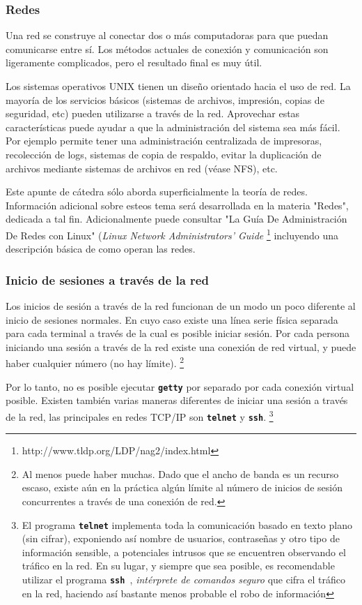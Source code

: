 \documentclass[12pt]{article}
\begin{document}
\subsubsection{ Redes}

 Una red se construye al conectar dos o más computadoras para que puedan
comunicarse entre sí. Los métodos actuales de conexión y comunicación son
ligeramente complicados, pero el resultado final es muy útil.  

 Los sistemas operativos UNIX tienen un diseño orientado hacia el uso 
de red. La mayoría de los servicios básicos (sistemas de archivos, impresión, 
copias de seguridad, etc) pueden utilizarse a través de la red. Aprovechar estas
características puede ayudar a que la administración del sistema sea más fácil. 
Por ejemplo permite tener una administración centralizada de impresoras, recolección 
de logs, sistemas de copia de respaldo, evitar la duplicación 
de archivos mediante sistemas de archivos en red (véase NFS), etc.

 Este apunte de cátedra sólo aborda superficialmente la teoría de
redes. Información adicional sobre esteos tema será desarrollada en la materia 
"Redes", dedicada a tal fin. Adicionalmente puede consultar "La Guía De Administración 
De Redes con Linux" (\textit{Linux Network Administrators' Guide} 
\footnote{	http://www.tldp.org/LDP/nag2/index.html}
incluyendo una descripción básica de como
operan las redes.  

\subsubsection{ Inicio de sesiones a través de la red}

 Los inicios de sesión a través de la red funcionan de un modo un poco
diferente al inicio de sesiones normales. En cuyo caso existe una línea serie 
física separada para cada terminal a través de la cual es posible iniciar sesión. 
Por cada persona iniciando una sesión a través de la red existe una conexión de red
virtual, y puede haber cualquier número (no hay límite).  
\footnote{Al menos puede haber muchas. Dado que el ancho de banda es un
recurso escaso, existe aún en la práctica algún límite al
número de inicios de sesión concurrentes a través de una conexión
de red. }

Por lo tanto, no es posible ejecutar \texttt{\textbf{getty}} por separado 
por cada conexión virtual posible. Existen
también varias maneras diferentes de iniciar una sesión a través de la red, las
principales en redes TCP/IP son \texttt{\textbf{telnet}} y \texttt{\textbf{ssh}}.
\footnote{El programa \texttt{\textbf{telnet}} implementa toda la comunicación basado en
texto plano (sin cifrar), exponiendo así nombre de usuarios, contraseñas y otro tipo de 
información sensible, a potenciales intrusos que se encuentren observando el tráfico en la red. 
En su lugar, y siempre que sea posible, es recomendable utilizar el programa \texttt{\textbf{ssh }}, 
\textit{intérprete de comandos seguro} que cifra el tráfico en la red, haciendo
así bastante menos probable el robo de información}
\end{document}
